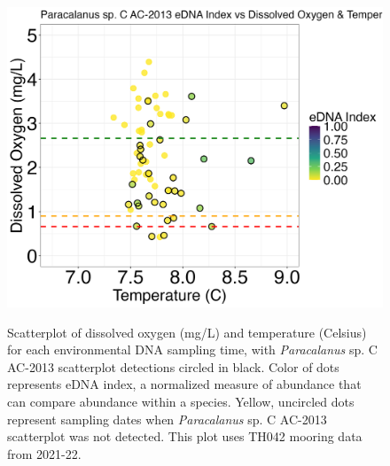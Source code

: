\documentclass[12pt,twoside]{reedthesis}
\begin{document}
		\begin{figure}[!h]
		\begin{center}
			\includegraphics[scale=0.3]{Paracalanus_Scatter_noOut} \\
			\caption[\textit{Paracalanus} sp. C AC-2013 scatterplot]{\footnotesize{Scatterplot of dissolved oxygen (mg/L) and temperature (Celsius) for each environmental DNA sampling time, with \textit{Paracalanus} sp. C AC-2013 scatterplot detections circled in black. Color of dots represents eDNA index, a normalized measure of abundance that can compare abundance within a species. Yellow, uncircled dots represent sampling dates when \textit{Paracalanus} sp. C AC-2013 scatterplot was not detected. This plot uses TH042 mooring data from 2021-22.}} %
			\label{ParacalanusScatterApp}
		\end{center}
	\end{figure} 
	
\end{document}
